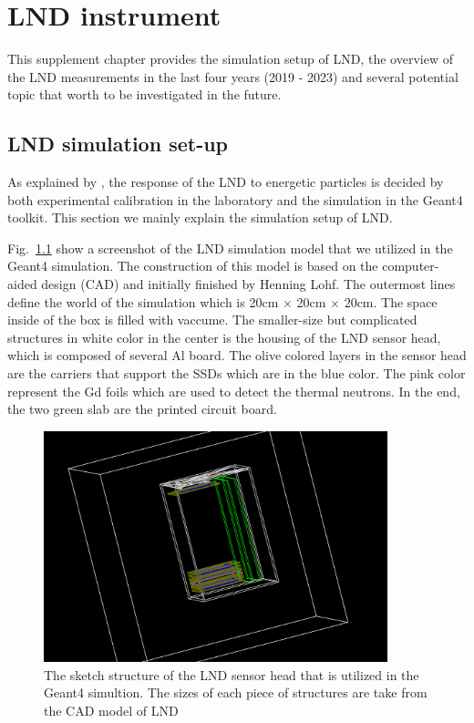 \chapter{LND instrument}
\label{chp:LNDinstrument}

This supplement chapter provides the simulation setup of \ac{LND}, the overview of the \ac{LND} measurements in the last four years (2019 - 2023) and several potential topic that worth to be investigated in the future.

\section{LND simulation set-up}
\label{chp:LNDsimulation}

As explained by \citet{Wimmer-2020-LND}, the response of the \ac{LND} to energetic particles is decided by both experimental calibration in the laboratory and the simulation in the \ac{Geant4} toolkit. This section we mainly explain the simulation setup of \ac{LND}.

Fig.~\ref{fig:LND_simulation_model}
show a screenshot of the \ac{LND} simulation model that we utilized in the \ac{Geant4} simulation. The construction of this model is based on the computer-aided design (CAD) and initially finished by Henning Lohf. 
The outermost lines define the world of the simulation which is 20cm $\times$ 20cm $\times$ 20cm. The space inside of the box is filled with vaccume. The smaller-size but complicated structures in white color in the center is the housing of the \ac{LND} sensor head, which is composed of several Al board.
The olive colored layers in the sensor head are the carriers that support the \acp{SSD} which are in the blue color. The pink color represent the Gd foils which are used to detect the thermal neutrons. In the end, the two green slab are the printed circuit board.


\begin{figure}[!htb]
    \centering
    \includegraphics[width= 0.89\textwidth, height = 0.6\textwidth]{images/LND_model.png}
    \caption[The sketch of \ac{LND} sensor head]{The sketch structure of the \ac{LND} sensor head that is utilized in the \ac{Geant4} simultion. The sizes of each piece of structures are take from the CAD model of \ac{LND}}
    \label{fig:LND_simulation_model}
\end{figure}


